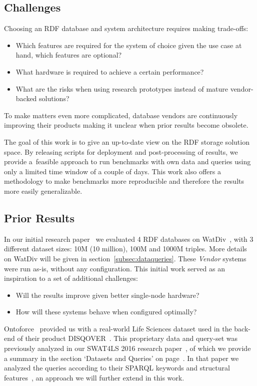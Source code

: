 \subsection{Challenges}
Choosing an RDF database and system architecture requires making trade-offs: 

\begin{itemize}
	\item Which features are required for the system of choice given the use case at hand, which features are optional?
	\item What hardware is required to achieve a certain performance?
	\item What are the risks when using research prototypes instead of mature vendor-backed solutions? 
\end{itemize}

To make matters even more complicated, database vendors are continuously improving their products making it unclear when prior results become obsolete.

The goal of this work is to give an up-to-date view on the RDF storage solution space.
By releasing scripts for deployment and post-processing of results, we provide a~feasible approach to run benchmarks with own data and queries using only a limited time window of a couple of days.
This work also offers a methodology to make benchmarks more reproducible and therefore the results more easily generalizable.

\subsection{Prior Results}
In our initial research paper~\cite{de2016big} we evaluated 4 RDF databases on WatDiv~\cite{alucc2014diversified}, with 3 different dataset sizes: 10M (10 million), 100M and 1000M triples. More details on WatDiv will be given in section~\ref{subsec:dataqueries}. These \emph{Vendor} systems were run as-is, without any configuration. 
This initial work served as an inspiration to a set of additional challenges:

\begin{itemize}
\item Will the results improve given better single-node hardware?
\item How will these systems behave when configured optimally?
\end{itemize}

Ontoforce~\cite{ontoforcewebsite} provided us with a real-world Life \mbox{Sciences} dataset used in the back-end of their product \mbox{DISQOVER~\cite{disqover}}. This proprietary data and query-set was previously analyzed in our SWAT4LS 2016 research paper~\cite{dewitte_swat4ls_2016}, of which we provide a summary in the section `Datasets and Queries' on page~\pageref{subsec:dataqueries}.
In that paper we analyzed the queries according to their SPARQL keywords and structural features~\cite{DBLP:journals/corr/abs-1103-5043}, an approach we will further extend in this work. 

